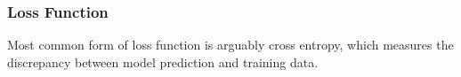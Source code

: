 \subsubsection{Loss Function}

Most common form of loss function is arguably cross entropy, which measures the discrepancy between model prediction and training data. 